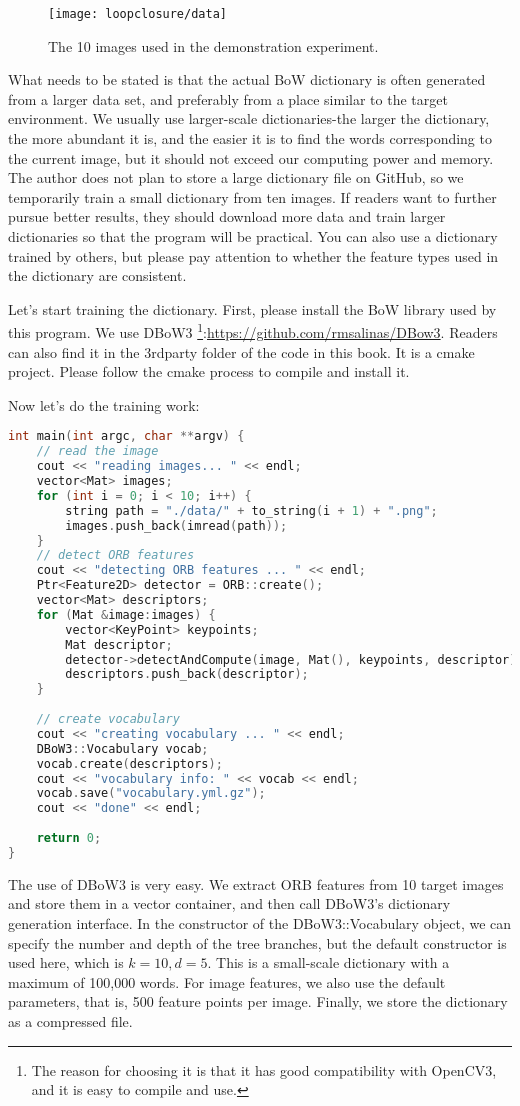 \begin{figure}[!htp]
	\centering
	\texttt{[image: loopclosure/data]}
	\caption{The 10 images used in the demonstration experiment.}
	\label{fig:lp-data}
\end{figure}

What needs to be stated is that the actual BoW dictionary is often generated from a larger data set, and preferably from a place similar to the target environment. We usually use larger-scale dictionaries-the larger the dictionary, the more abundant it is, and the easier it is to find the words corresponding to the current image, but it should not exceed our computing power and memory. The author does not plan to store a large dictionary file on GitHub, so we temporarily train a small dictionary from ten images. If readers want to further pursue better results, they should download more data and train larger dictionaries so that the program will be practical. You can also use a dictionary trained by others, but please pay attention to whether the feature types used in the dictionary are consistent.

Let's start training the dictionary. First, please install the BoW library used by this program. We use DBoW3 \footnote{The reason for choosing it is that it has good compatibility with OpenCV3, and it is easy to compile and use. }:\url{https://github.com/rmsalinas/DBow3}. Readers can also find it in the 3rdparty folder of the code in this book. It is a cmake project. Please follow the cmake process to compile and install it.

Now let's do the training work: 
\begin{lstlisting}[language=c++,caption=slambook2/ch11/feature\_training.cpp]
int main(int argc, char **argv) {
	// read the image 
	cout << "reading images... " << endl;
	vector<Mat> images;
	for (int i = 0; i < 10; i++) {
		string path = "./data/" + to_string(i + 1) + ".png";
		images.push_back(imread(path));
	}
	// detect ORB features
	cout << "detecting ORB features ... " << endl;
	Ptr<Feature2D> detector = ORB::create();
	vector<Mat> descriptors;
	for (Mat &image:images) {
		vector<KeyPoint> keypoints;
		Mat descriptor;
		detector->detectAndCompute(image, Mat(), keypoints, descriptor);
		descriptors.push_back(descriptor);
	}
	
	// create vocabulary 
	cout << "creating vocabulary ... " << endl;
	DBoW3::Vocabulary vocab;
	vocab.create(descriptors);
	cout << "vocabulary info: " << vocab << endl;
	vocab.save("vocabulary.yml.gz");
	cout << "done" << endl;
	
	return 0;
}
\end{lstlisting}
The use of DBoW3 is very easy. We extract ORB features from 10 target images and store them in a vector container, and then call DBoW3's dictionary generation interface. In the constructor of the DBoW3::Vocabulary object, we can specify the number and depth of the tree branches, but the default constructor is used here, which is $k=10,d=5$. This is a small-scale dictionary with a maximum of 100,000 words. For image features, we also use the default parameters, that is, 500 feature points per image. Finally, we store the dictionary as a compressed file.

